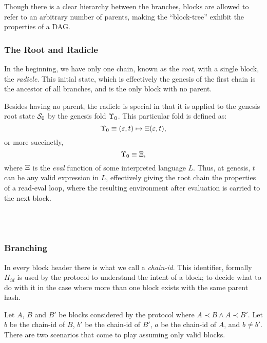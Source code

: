 Though there is a clear hierarchy between the branches, blocks are allowed to
refer to an arbitrary number of parents, making the ``block-tree'' exhibit the
properties of a DAG.


\subsubsection{The Root and Radicle}
\label{s:root}

In the beginning, we have only one chain, known as the \emph{root}, with a
single block, the \emph{radicle}. This initial state, which is effectively the
genesis of the first chain is the ancestor of all branches, and is the only
block with no parent.

Besides having no parent, the radicle is special in that it is applied to the
genesis root state $\mathcal{S}_0$ by the genesis fold $\Upsilon_{0}$. This particular
fold is defined as:
\[
    \Upsilon_{0} \equiv (\varepsilon, t) \mapsto \operatorname{\Xi} (\varepsilon, t),
\]
or more succinctly,
\[
    \Upsilon_0 \equiv \operatorname{\Xi},
\]
where $\operatorname{\Xi}$ is the \emph{eval} function of some interpreted language $L$.
Thus, at genesis, $t$ can be any valid expression in $L$, effectively giving
the root chain the properties of a read-eval loop, where the resulting
environment after evaluation is carried to the next block.

 \\
 \\

\subsubsection{Branching}

In every block header there is what we call a \emph{chain-id}. This identifier,
formally $H_{id}$ is used by the protocol to understand the intent of a block;
to decide what to do with it in the case where more than one block exists with
the same parent hash.

Let $A$, $B$ and $B'$ be blocks considered by the protocol where $A \prec B
\wedge A \prec B'$.  Let $b$ be the chain-id of $B$,  $b'$ be the chain-id of
$B'$, $a$ be the chain-id of $A$, and $b \neq b'$. There are two scenarios
that come to play assuming only valid blocks.

